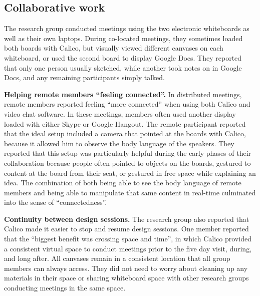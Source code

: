 \documentclass[12pt,fleqn]{ucithesis}
\begin{document}
\subsection{Collaborative work}

The research group conducted meetings using the two electronic whiteboards as well as their own laptops. During co-located meetings, they sometimes loaded both boards with Calico, but visually viewed different canvases on each whiteboard, or used the second board to display Google Docs. They reported that only one person usually sketched, while another took notes on in Google Docs, and any remaining participants simply talked. 


\textbf{Helping remote members ``feeling connected''.} In distributed meetings, remote members reported feeling ``more connected'' when using both Calico and video chat software. In these meetings, members often used another display loaded with either Skype or Google Hangout. The remote participant reported that the ideal setup included a camera that pointed at the boards with Calico, because it allowed him to observe the body language of the speakers. They reported that this setup was particularly helpful during the early phases of their collaboration because people often pointed to objects on the boards, gestured to content at the board from their seat, or gestured in free space while explaining an idea. The combination of both being able to see the body language of remote members and being able to manipulate that same content in real-time culminated into the sense of ``connectedness''.


\textbf{Continuity between design sessions.} The research group also reported that Calico made it easier to stop and resume design sessions. One member reported that the ``biggest benefit was crossing space and time'', in which Calico provided a consistent virtual space to conduct meetings prior to the five day visit, during, and long after. All canvases remain in a consistent location that all group members can always access. They did not need to worry about cleaning up any materials in their space or sharing whiteboard space with other research groups conducting meetings in the same space. 
\end{document}
